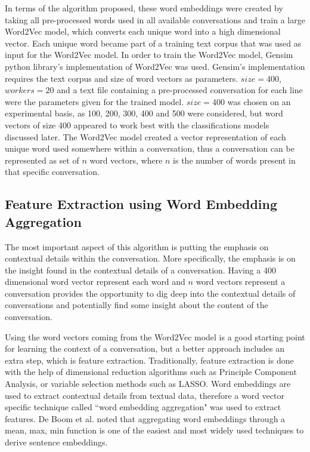 \documentclass[11pt]{article}
\begin{document}
In terms of the algorithm proposed, these word embeddings were created by taking all pre-processed words used in all available conversations and train a large Word2Vec model, which converts each unique word into a high dimensional vector. Each unique word became part of a training text corpus that was used as input for the Word2Vec model. In order to train the Word2Vec model, Gensim \cite{rehurek_lrec} python library's implementation of Word2Vec was used. Gensim's implementation requires the text corpus and size of word vectors as parameters. $size = 400$, $workers=20$ and a text file containing a pre-processed conversation for each line were the parameters given for the trained model. $size = 400$ was chosen on an experimental basis, as 100, 200, 300, 400 and 500 were considered, but word vectors of size 400 appeared to work best with the classifications models discussed later. The Word2Vec model created a vector representation of each unique word used somewhere within a conversation, thus a conversation can be represented as set of $n$ word vectors, where $n$ is the number of words present in that specific conversation. 

\subsection{Feature Extraction using Word Embedding Aggregation}
The most important aspect of this algorithm is putting the emphasis on contextual details within the conversation. More specifically, the emphasis is on the insight found in the contextual details of a conversation. Having a 400 dimensional word vector represent each word and $n$ word vectors represent a conversation provides the opportunity to dig deep into the contextual details of conversations and potentially find some insight about the content of the conversation. 

Using the word vectors coming from the Word2Vec model is a good starting point for learning the context of a conversation, but a better approach includes an extra step, which is feature extraction. Traditionally, feature extraction is done with the help of dimensional reduction algorithms such as Principle Component Analysis, or variable selection methods such as LASSO. Word embeddings are used to extract contextual details from textual data, therefore a word vector specific technique called ``word embedding aggregation" \cite{de2016representation} was used to extract features. De Boom et al. noted that aggregating word embeddings through a mean, max, min function is one of the easiest and most widely used techniques to derive sentence embeddings. 
\end{document}
